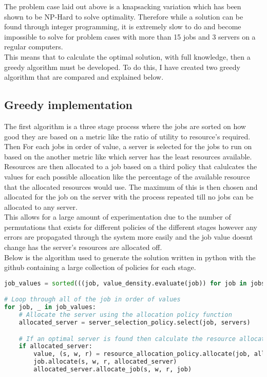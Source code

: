 The problem case laid out above is a knapsacking variation which has been shown to be NP-Hard to solve optimality.
Therefore while a solution can be found through integer programming, it is extremely slow to do and become impossible to solve for
problem cases with more than 15 jobs and 3 servers on a regular computers. \\
This means that to calculate the optimal solution, with full knowledge, then a greedy algorithm must be developed.
To do this, I have created two greedy algorithm that are compared and explained below. \\

\subsection{Greedy implementation}\label{subsec:greedy-implementation}
The first algorithm is a three stage process where the jobs are sorted on how good they are based on a metric like the
ratio of utility to resource's required. Then For each jobs in order of value, a server is selected for the jobs to run
on based on the another metric like which server has the least resources available. Resources are then allocated to a
job based on a third policy that calulcates the values for each possible allocation like the percentage of the available
resource that the allocated resources would use. The maximum of this is then chosen and allocated for the job on the server
with the process repeated till no jobs can be allocated to any server. \\
This allows for a large amount of experimentation due to the number of permutations that exists for different policies of
the different stages however any errors are propagated through the system more easily and the job value doesnt change has
the server's resources are allocated off. \\
Below is the algorithm used to generate the solution written in python with the github containing a large collection of
policies for each stage. \\

\begin{lstlisting}[language=Python]
job_values = sorted(((job, value_density.evaluate(job)) for job in jobs), key=lambda jv: jv[1], reverse=True)

# Loop through all of the job in order of values
for job, _ in job_values:
    # Allocate the server using the allocation policy function
    allocated_server = server_selection_policy.select(job, servers)

    # If an optimal server is found then calculate the resource allocation policy
    if allocated_server:
        value, (s, w, r) = resource_allocation_policy.allocate(job, allocated_server)
        job.allocate(s, w, r, allocated_server)
        allocated_server.allocate_job(s, w, r, job)
\end{lstlisting}

